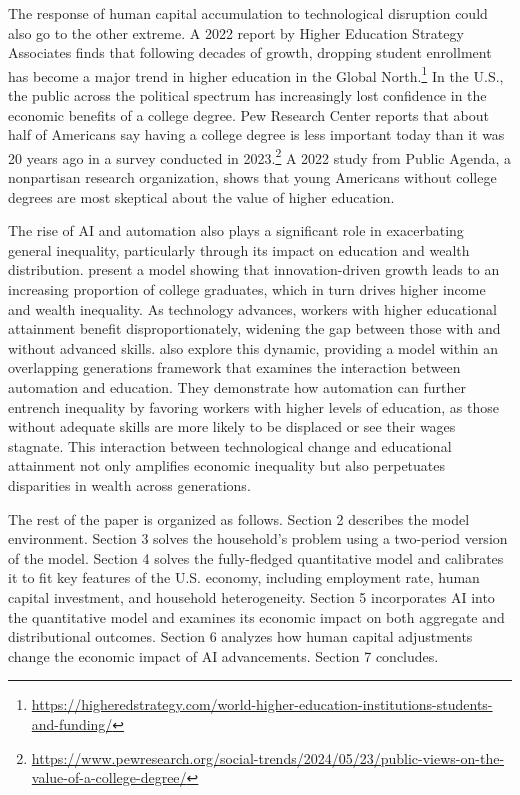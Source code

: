 \documentclass[12pt]{article}
\begin{document}
The response of human capital accumulation to technological disruption could also go to the other extreme. A 2022 report by Higher Education Strategy Associates finds that following decades of growth, dropping student enrollment has become a major trend in higher education in the Global North.\footnote{\url{https://higheredstrategy.com/world-higher-education-institutions-students-and-funding/}} In the U.S., the public across the political spectrum has increasingly lost confidence in the economic benefits of a college degree. Pew Research Center reports that about half of Americans say having a college degree is less important today than it was 20 years ago in a survey conducted in 2023.\footnote{\url{https://www.pewresearch.org/social-trends/2024/05/23/public-views-on-the-value-of-a-college-degree/}} A 2022 study from Public Agenda, a nonpartisan research organization, shows that young Americans without college degrees are most skeptical about the value of higher education.


The rise of AI and automation also plays a significant role in exacerbating
general inequality, particularly through its impact on education and
wealth distribution. \citet{Prettner2020} present a model showing
that innovation-driven growth leads to an increasing proportion of
college graduates, which in turn drives higher income and wealth inequality.
As technology advances, workers with higher educational attainment
benefit disproportionately, widening the gap between those with and
without advanced skills. \citet{Sachs2012} also explore this dynamic,
providing a model within an overlapping generations framework that
examines the interaction between automation and education. They demonstrate
how automation can further entrench inequality by favoring workers
with higher levels of education, as those without adequate skills
are more likely to be displaced or see their wages stagnate. This
interaction between technological change and educational attainment
not only amplifies economic inequality but also perpetuates disparities
in wealth across generations.

The rest of the paper is organized as follows. Section 2 describes the model environment. Section 3 solves the household's problem using a two-period version of the model. Section 4 solves the fully-fledged quantitative model and calibrates it to fit key features of the U.S. economy, including employment rate, human capital investment, and household heterogeneity. Section 5 incorporates AI into the quantitative model and examines its economic impact on both aggregate and distributional outcomes. Section 6 analyzes how human capital adjustments change the economic impact of AI advancements. Section 7 concludes.
\end{document}
